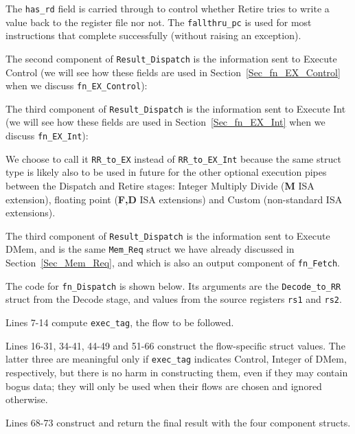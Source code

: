 The \verb|has_rd| field is carried through to control whether Retire
tries to write a value back to the register file nor not.  The
\verb|fallthru_pc| is used for most instructions that complete
successfully (without raising an exception).

The second component of \verb|Result_Dispatch| is the information sent
to Execute Control (we will see how these fields are used in
Section~\ref{Sec_fn_EX_Control} when we discuss \verb|fn_EX_Control|):


The third component of \verb|Result_Dispatch| is the information sent
to Execute Int (we will see how these fields are used in
Section~\ref{Sec_fn_EX_Int} when we discuss \verb|fn_EX_Int|):


We choose to call it \verb|RR_to_EX| instead of \verb|RR_to_EX_Int|
because the same struct type is likely also to be used in future for
the other optional execution pipes between the Dispatch and Retire
stages: Integer Multiply Divide ({\bf M} ISA extension), floating
point ({\bf F,D} ISA extensions) and Custom (non-standard ISA
extensions).

The third component of \verb|Result_Dispatch| is the information sent
to Execute DMem, and is the same \verb|Mem_Req| struct we have already
discussed in Section~\ref{Sec_Mem_Req}, and which is also an output
component of \verb|fn_Fetch|.

The code for \verb|fn_Dispatch| is shown below.  Its arguments are the
\verb|Decode_to_RR| struct from the Decode stage, and values from the
source registers \verb|rs1| and \verb|rs2|.


Lines 7-14 compute \verb|exec_tag|, {\ie} the flow to be followed.

Lines 16-31, 34-41, 44-49 and 51-66 construct the flow-specific struct
values.  The latter three are meaningful only if \verb|exec_tag|
indicates Control, Integer of DMem, respectively, but there is no harm
in constructing them, even if they may contain bogus data; they will
only be used when their flows are chosen and ignored otherwise.

Lines 68-73 construct and return the final result with the four
component structs.



